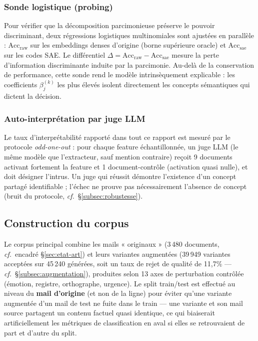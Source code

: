 \documentclass[11pt]{article}
\begin{document}
\subsubsection{Sonde logistique (probing)}
Pour vérifier que la décomposition parcimonieuse préserve le pouvoir
discriminant, deux régressions logistiques multinomiales sont ajustées en
parallèle : $\text{Acc}_\text{raw}$ sur les embeddings denses d'origine
(borne supérieure oracle) et $\text{Acc}_\text{sae}$ sur les codes SAE. Le
différentiel $\Delta = \text{Acc}_\text{raw} - \text{Acc}_\text{sae}$ mesure
la perte d'information discriminante induite par la parcimonie. Au-delà de la
conservation de performance, cette sonde rend le modèle intrinsèquement
explicable : les coefficients $\beta_j^{(k)}$ les plus élevés isolent
directement les concepts sémantiques qui dictent la décision.

\subsubsection{Auto-interprétation par juge LLM}
Le taux d'interprétabilité rapporté dans tout ce rapport est mesuré par le
protocole \emph{odd-one-out} : pour chaque feature échantillonnée, un juge LLM
(le même modèle que l'extracteur, sauf mention contraire) reçoit 9 documents
activant fortement la feature et 1 document-contrôle (activation quasi
nulle), et doit désigner l'intrus. Un juge qui réussit démontre l'existence
d'un concept partagé identifiable ; l'échec ne prouve pas nécessairement
l'absence de concept (bruit du protocole, \emph{cf.}~\S\ref{subsec:robustesse}).

\subsection{Construction du corpus}

Le corpus principal combine les mails « originaux » (3\,480 documents,
\emph{cf.}~encadré \S\ref{sec:etat-art}) et leurs variantes augmentées
(39\,949 variantes acceptées sur 45\,240 générées, soit un taux de rejet de
qualité de 11,7\% --- \emph{cf.}~\S\ref{subsec:augmentation}), produites selon
13 axes de perturbation contrôlée (émotion, registre, orthographe, urgence).
Le split train/test est effectué au niveau du \textbf{mail d'origine} (et non
de la ligne) pour éviter qu'une variante augmentée d'un mail de test ne fuite
dans le train --- une variante et son mail source partagent un contenu
factuel quasi identique, ce qui biaiserait artificiellement les métriques de
classification en aval si elles se retrouvaient de part et d'autre du split.
\end{document}

